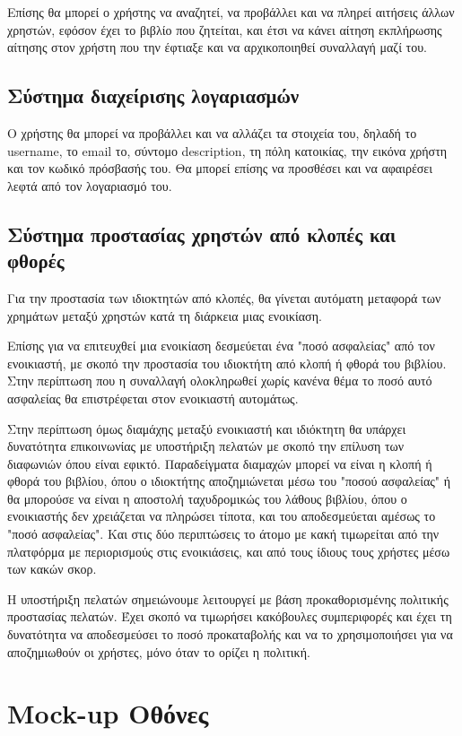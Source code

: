 \documentclass[12pt,a4paper]{article}
\begin{document}
Επίσης θα μπορεί ο χρήστης να αναζητεί, να προβάλλει και να πληρεί αιτήσεις άλλων χρηστών, εφόσον έχει το βιβλίο που ζητείται, και έτσι να κάνει αίτηση εκπλήρωσης αίτησης στον χρήστη που την έφτιαξε και να αρχικοποιηθεί συναλλαγή μαζί του.

\subsection{Σύστημα διαχείρισης λογαριασμών}
Ο χρήστης θα μπορεί να προβάλλει και να αλλάζει τα στοιχεία του, δηλαδή το username, το email το, σύντομο description, τη πόλη κατοικίας, την  εικόνα χρήστη και τον κωδικό πρόσβασής του. Θα μπορεί επίσης να προσθέσει και να αφαιρέσει λεφτά από τον λογαριασμό του. 

\subsection{Σύστημα προστασίας χρηστών από κλοπές και φθορές}
Για την προστασία των ιδιοκτητών από κλοπές, θα γίνεται αυτόματη μεταφορά των χρημάτων μεταξύ χρηστών κατά τη διάρκεια μιας ενοικίαση. 

Επίσης για να επιτευχθεί μια ενοικίαση δεσμεύεται ένα "ποσό ασφαλείας" από τον ενοικιαστή, με σκοπό την προστασία του ιδιοκτήτη από κλοπή ή φθορά του βιβλίου. Στην περίπτωση που η συναλλαγή ολοκληρωθεί χωρίς κανένα θέμα το ποσό αυτό ασφαλείας θα επιστρέφεται στον ενοικιαστή αυτομάτως.

Στην περίπτωση όμως διαμάχης μεταξύ ενοικιαστή και ιδιόκτητη θα υπάρχει δυνατότητα επικοινωνίας με υποστήριξη πελατών με σκοπό την επίλυση των διαφωνιών όπου είναι εφικτό. Παραδείγματα διαμαχών μπορεί να είναι η κλοπή ή φθορά του βιβλίου, όπου ο ιδιοκτήτης αποζημιώνεται μέσω του "ποσού ασφαλείας" ή θα μπορούσε να είναι η αποστολή ταχυδρομικώς του λάθους βιβλίου, όπου ο ενοικιαστής δεν χρειάζεται να πληρώσει τίποτα, και του αποδεσμεύεται αμέσως το "ποσό ασφαλείας". Και στις δύο περιπτώσεις το άτομο με κακή τιμωρείται από την πλατφόρμα με περιορισμούς στις ενοικιάσεις, και από τους ίδιους τους χρήστες μέσω των κακών σκορ.

Η υποστήριξη πελατών σημειώνουμε λειτουργεί με βάση προκαθορισμένης πολιτικής προστασίας πελατών. Έχει σκοπό να τιμωρήσει κακόβουλες συμπεριφορές και έχει τη δυνατότητα να αποδεσμεύσει το ποσό προκαταβολής και να το χρησιμοποιήσει για να αποζημιωθούν οι χρήστες, μόνο όταν το ορίζει η πολιτική.

\section{Mock-up Οθόνες}
\end{document}
